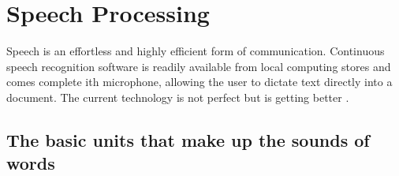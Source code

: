 \chapter{Speech Processing}\label{ch:speech_processing}

Speech is an effortless and highly efficient form of communication. Continuous speech recognition software is readily available from local computing stores and comes complete ith microphone, allowing the user to dictate text directly into a document. The current technology is not perfect but is getting better \cite[p.~396]{callan2003artificial}.

\section{The basic units that make up the sounds of words}
